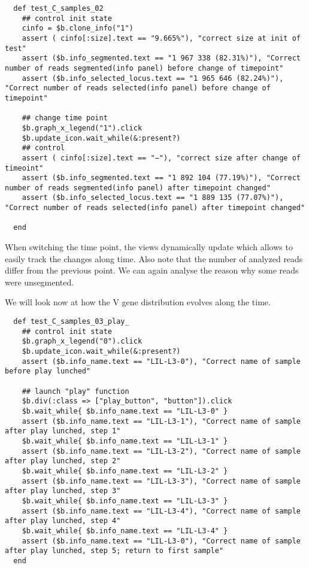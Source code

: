 \begin{verbatim}
  def test_C_samples_02
    ## control init state
    cinfo = $b.clone_info("1")
    assert ( cinfo[:size].text == "9.665%"), "correct size at init of test"
    assert ($b.info_segmented.text == "1 967 338 (82.31%)"), "Correct number of reads segmented(info panel) before change of timepoint"
    assert ($b.info_selected_locus.text == "1 965 646 (82.24%)"), "Correct number of reads selected(info panel) before change of timepoint"

    ## change time point
    $b.graph_x_legend("1").click
    $b.update_icon.wait_while(&:present?)
    ## control
    assert ( cinfo[:size].text == "−"), "correct size after change of timeoint"
    assert ($b.info_segmented.text == "1 892 104 (77.19%)"), "Correct number of reads segmented(info panel) after timepoint changed"
    assert ($b.info_selected_locus.text == "1 889 135 (77.07%)"), "Correct number of reads selected(info panel) after timepoint changed"

  end
\end{verbatim}

When switching the time point, the views dynamically update which allows to
easily track the changes along time. Also note that the number of analyzed
reads differ from the previous point. We can again analyse the reason why some
reads were unsegmented.

\bigskip

We will look now at how the V gene distribution evolves along the time.
\begin{verbatim}
  def test_C_samples_03_play_
    ## control init state
    $b.graph_x_legend("0").click
    $b.update_icon.wait_while(&:present?)
    assert ($b.info_name.text == "LIL-L3-0"), "Correct name of sample before play lunched"

    ## launch "play" function
    $b.div(:class => ["play_button", "button"]).click
    $b.wait_while{ $b.info_name.text == "LIL-L3-0" }
    assert ($b.info_name.text == "LIL-L3-1"), "Correct name of sample after play lunched, step 1"
    $b.wait_while{ $b.info_name.text == "LIL-L3-1" }
    assert ($b.info_name.text == "LIL-L3-2"), "Correct name of sample after play lunched, step 2" 
    $b.wait_while{ $b.info_name.text == "LIL-L3-2" }
    assert ($b.info_name.text == "LIL-L3-3"), "Correct name of sample after play lunched, step 3"
    $b.wait_while{ $b.info_name.text == "LIL-L3-3" }
    assert ($b.info_name.text == "LIL-L3-4"), "Correct name of sample after play lunched, step 4"
    $b.wait_while{ $b.info_name.text == "LIL-L3-4" }
    assert ($b.info_name.text == "LIL-L3-0"), "Correct name of sample after play lunched, step 5; return to first sample"
  end
\end{verbatim}

